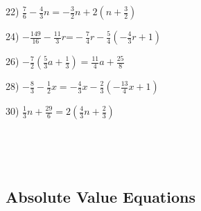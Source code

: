 \begin{multicols}{2}
  22) $\frac{7}{6} - \frac{4}{3} n = - \frac{3}{2} n + 2 (n + \frac{3}{2})$
  
  24) $- \frac{149}{16} - \frac{11}{3} r \text{=} - \frac{7}{4} r -
  \frac{5}{4} (- \frac{4}{3} r + 1)$
  
  26) $- \frac{7}{2} (\frac{5}{3} a + \frac{1}{3}) = \frac{11}{4} a +
  \frac{25}{8}$
  
  28) $- \frac{8}{3} - \frac{1}{2} x = - \frac{4}{3} x - \frac{2}{3} (-
  \frac{13}{4} x + 1)$
  
  30) $\frac{1}{3} n + \frac{29}{6} = 2 (\frac{4}{3} n + \frac{2}{3})$
  
  \ 
\end{multicols}

\vspace{3in}
~

\pagebreak

\subsection{Absolute Value Equations}\par

{}

